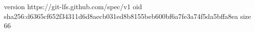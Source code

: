 version https://git-lfs.github.com/spec/v1
oid sha256:d6365cf652f34311d6d8aecb031ed8b8155beb600bf6a7fe3a74f5da5bffa8ea
size 66
